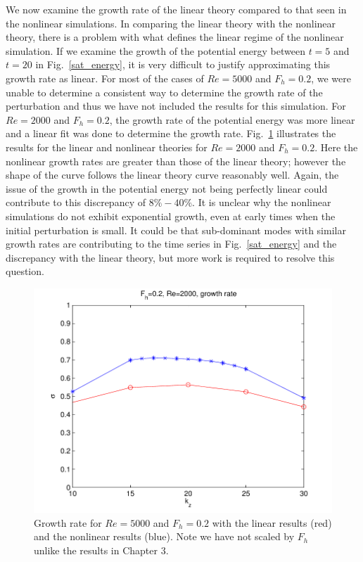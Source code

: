 We now examine the growth rate of the linear theory compared to that seen in the nonlinear simulations. In comparing the linear theory with the nonlinear theory, there is a problem with what defines the linear regime of the nonlinear simulation. If we examine the growth of the potential energy between $t=5$ and $t=20$ in Fig.~\ref{sat_energy}, it is very difficult to justify approximating this growth rate as linear. For most of the cases of $Re=5000$ and $F_{h}=0.2$, we were unable to determine a consistent way to determine the growth rate of the perturbation and thus we have not included the results for this simulation. For $Re=2000$ and $F_{h}=0.2$, the growth rate of the potential energy was more linear and a linear fit was done to determine the growth rate. Fig.~\ref{growth_rates_nonlinear} illustrates the results for the linear and nonlinear theories for $Re=2000$ and $F_{h}=0.2$. Here the nonlinear growth rates are greater than those of the linear theory; however the shape of the curve follows the linear theory curve reasonably well. Again, the issue of the growth in the potential energy not being perfectly linear could contribute to this discrepancy of $8\%-40\%$. It is unclear why the nonlinear simulations do not exhibit exponential growth, even at early times when the initial perturbation is small. It could be that sub-dominant modes with similar growth rates are contributing to the time series in Fig.~\ref{sat_energy} and the discrepancy with the linear theory, but more work is required to resolve this question. 

\begin{figure}
\begin{center}
\includegraphics[width=\textwidth]{re2000_fh02_growth_rates} 
\caption{Growth rate for $Re=5000$ and $F_{h}=0.2$ with the linear results (red) and the nonlinear results (blue). Note we have not scaled by $F_{h}$ unlike the results in Chapter 3.}
\label{growth_rates_nonlinear}
\end{center}
\end{figure}


